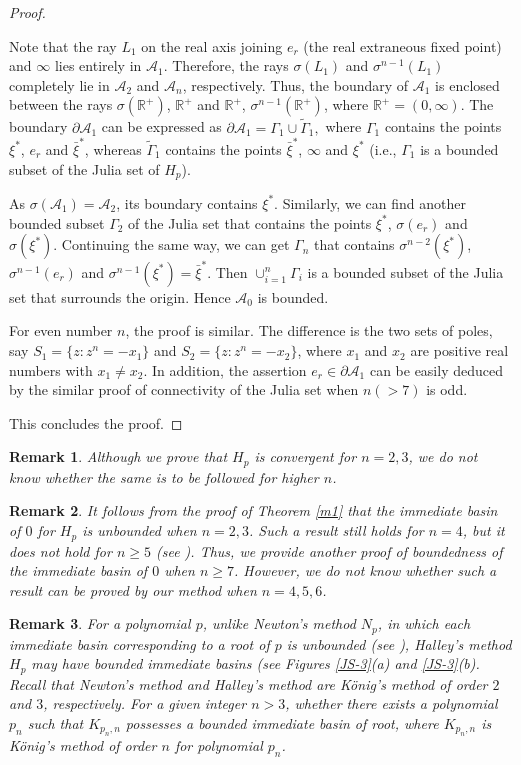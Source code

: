 \documentclass[12pt]{article}
\newtheorem{rem}{Remark}[section]
\begin{document}
\begin{proof}
\begin{enumerate}
Note that the ray $L_1$ on the real axis joining $e_r$ (the real extraneous fixed point) and $\infty$ lies entirely in $\mathcal{A}_1$. Therefore, the rays $\sigma(L_1)$ and $\sigma^{n-1}(L_1)$ completely lie in $\mathcal{A}_2$ and $\mathcal{A}_n$, respectively. Thus, the boundary of $\mathcal{A}_1$ is enclosed between the rays $\sigma(\mathbb{R}^+)$, $\mathbb{R}^+$ and $\mathbb{R}^+$, $\sigma^{n-1}(\mathbb{R}^+)$, where $\mathbb{R}^+=(0,\infty)$. The boundary $\partial \mathcal{A}_1$ can be expressed as
$
\partial \mathcal{A}_1 = \Gamma_1 \cup \tilde{\Gamma}_1 ,
$
where $\Gamma_1$ contains the points $\xi^*$, $e_r$ and $\bar{\xi}^*$, whereas $\tilde{\Gamma}_1$ contains the points $\bar{\xi}^*$, $\infty$ and $\xi^*$ (i.e., $\Gamma_1$ is a bounded subset of the Julia set of $H_p$).

As $\sigma(\mathcal{A}_1)=\mathcal{A}_2$, its boundary contains $\xi^*$. Similarly, we can find another bounded subset $\Gamma_2$ of the Julia set that contains the points $\xi^*$, $\sigma(e_r)$ and $\sigma(\xi^*)$. Continuing the same way, we can get $\Gamma_n$ that contains $\sigma^{n-2}(\xi^*)$, $\sigma^{n-1}(e_r)$ and $\sigma^{n-1}(\xi^*)=\bar{\xi}^*$. Then $\cup_{i=1}^{n} \Gamma_i$ is a bounded subset of the Julia set that surrounds the origin. Hence $\mathcal{A}_0$ is bounded.
\par 
For even number $n$, the proof is similar.
The difference is the two sets of poles, say $S_1=\{z:z^n=-x_1\}$ and $S_2=\{z:z^n=-x_2\}$, where $x_1$ and $x_2$ are positive real numbers with $x_1\neq x_2$.
In addition, the assertion $e_{r} \in \partial \mathcal{A}_{1}$ can be easily deduced by the similar proof of connectivity of the Julia set when $n(>7)$ is odd.
\end{enumerate}
This concludes the proof.
\end{proof}
\begin{rem}
Although we prove that $H_p$ is convergent for $n=2,3$, we do not know whether the same is to be followed for higher $n$.
\end{rem}
\begin{rem}
It follows from the proof of Theorem \ref{m1} that the immediate basin of $ 0 $ for $  H_p $ is unbounded when $n=2,3$.
Such a result still holds for $n=4$, but it does not hold for $n\geq5$ (see \cite[Theorem 3.7]{CGJ2025}).
Thus, we provide another proof of boundedness of the immediate basin of $0$ when $n \geq 7$.
However, we do not know whether such a result can be proved by our method when $n=4,5,6$.
\end{rem}
\begin{rem}
For a polynomial $p$, unlike Newton's method $N_p$, in which each immediate basin corresponding to a root of $p$ is unbounded (see \cite[Proposition 6]{HSS2001}), Halley's method $H_p$ may have bounded immediate basins (see Figures \ref{JS-3}(a) and \ref{JS-3}(b).
Recall that Newton's method and Halley's method are K\"{o}nig's method of order $2$ and $3$, respectively.
For a given integer $n>3$, whether there exists a polynomial $p_n$ such that $K_{p_n,n}$ possesses a bounded immediate basin of root, where $K_{p_n,n}$ is K\"{o}nig's method
of order $n$ for polynomial $p_n$.
\end{rem}
\end{document}
